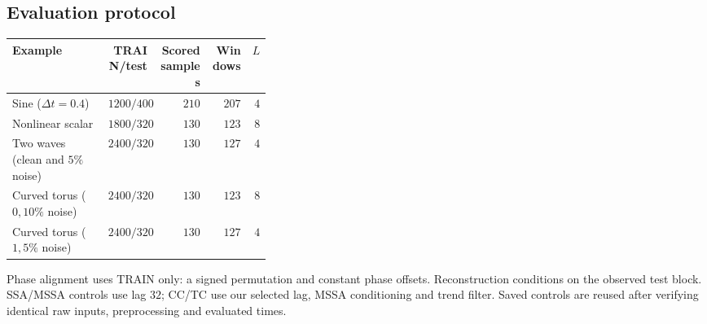 \documentclass[11pt,a4paper]{article}
\begin{document}
\subsection*{Evaluation protocol}
\begin{center}
\begin{tabular}{@{}p{0.37\linewidth}rrrr@{}}
\toprule
Example & TRAIN/test & Scored samples & Windows & $L$\\
\midrule
Sine ($\Delta t=0.4$) & $1200/400$ & $210$ & $207$ & $4$\\
Nonlinear scalar & $1800/320$ & $130$ & $123$ & $8$\\
Two waves (clean and $5\%$ noise) & $2400/320$ & $130$ & $127$ & $4$\\
Curved torus ($0,10\%$ noise) & $2400/320$ & $130$ & $123$ & $8$\\
Curved torus ($1,5\%$ noise) & $2400/320$ & $130$ & $127$ & $4$\\
\bottomrule
\end{tabular}
\end{center}
Phase alignment uses TRAIN only: a signed permutation and constant phase
offsets. Reconstruction conditions on the observed test block.
SSA/MSSA controls use lag $32$; CC/TC use our selected lag, MSSA
conditioning and trend filter. Saved controls are reused after verifying
identical raw inputs, preprocessing and evaluated times.
\end{document}
